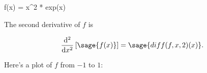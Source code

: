 \documentclass{article}
\begin{document}
\begin{sageblock}
  f(x) = x^2 * exp(x)
\end{sageblock}

The second derivative of $f$ is

\[
  \frac{\mathrm{d}^{2}}{\mathrm{d}x^{2}} \left[ \sage{f(x)} \right] =
  \sage{diff(f, x, 2)(x)}.
\]

Here's a plot of $f$ from $-1$ to $1$:

\end{document}
